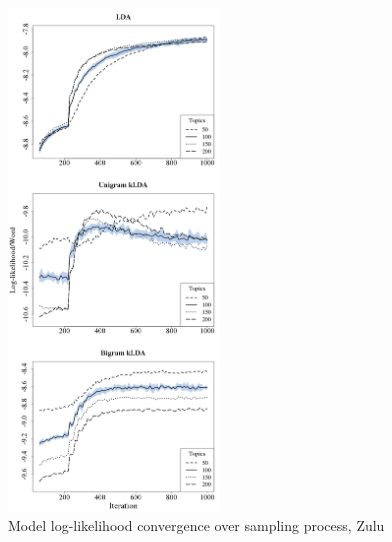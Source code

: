 \begin{figure}[t]
\begin{center}
\includegraphics[width=0.5\textwidth]{graphs/ch6/ll/zulu-lda-ll.png}
\end{center}
\caption[Log-Likelihood convergence, Zulu]{Model log-likelihood convergence over sampling process, Zulu\label{figC:llZulu}}
\end{figure}


